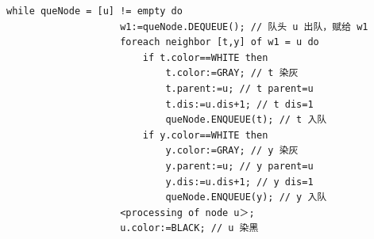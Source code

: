 \documentclass{article}
\begin{document}
\begin{enumerate}
\begin{itemize}
        \begin{lstlisting}[style=algorithmPPT]
                while queNode = [u] != empty do
                    w1:=queNode.DEQUEUE(); // 队头 u 出队，赋给 w1
                    foreach neighbor [t,y] of w1 = u do
                        if t.color==WHITE then
                            t.color:=GRAY; // t 染灰
                            t.parent:=u; // t parent=u
                            t.dis:=u.dis+1; // t dis=1
                            queNode.ENQUEUE(t); // t 入队
                        if y.color==WHITE then
                            y.color:=GRAY; // y 染灰
                            y.parent:=u; // y parent=u
                            y.dis:=u.dis+1; // y dis=1
                            queNode.ENQUEUE(y); // y 入队
                    <processing of node u＞;
                    u.color:=BLACK; // u 染黑
                \end{lstlisting}
    \end{itemize}

    \begin{figure}[htbp]
        \begin{minipage}[b]{0.6\textwidth}    %
            \centering
\end{minipage}
\end{figure}
\end{enumerate}
\end{document}
